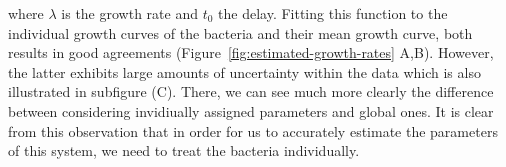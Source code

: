 \documentclass{article}
\begin{document}
where $\lambda$ is the growth rate and $t_0$ the delay.
Fitting this function to the individual growth curves of the bacteria and their mean growth curve,
both results in good agreements (Figure~\ref{fig:estimated-growth-rates} A,B).
However, the latter exhibits large amounts of uncertainty within the data which is also illustrated
in subfigure (C).
There, we can see much more clearly the difference between considering invidiually assigned
parameters and global ones.
It is clear from this observation that in order for us to accurately estimate the parameters of this
system, we need to treat the bacteria individually.

\end{document}
